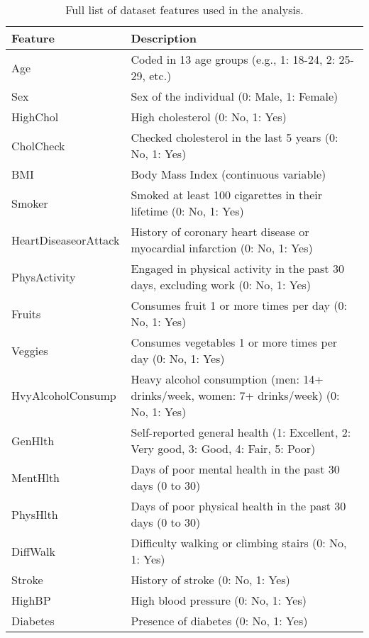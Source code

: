 \documentclass[a4paper,12pt]{article}
\begin{document}
\begin{table}[h!]
    \centering
    \begin{tabularx}{\textwidth}{|l|X|}
    \hline
    \textbf{Feature} & \textbf{Description} \\ \hline
    Age & Coded in 13 age groups (e.g., 1: 18-24, 2: 25-29, etc.) \\ \hline
    Sex & Sex of the individual (0: Male, 1: Female) \\ \hline
    HighChol & High cholesterol (0: No, 1: Yes) \\ \hline
    CholCheck & Checked cholesterol in the last 5 years (0: No, 1: Yes) \\ \hline
    BMI & Body Mass Index (continuous variable) \\ \hline
    Smoker & Smoked at least 100 cigarettes in their lifetime (0: No, 1: Yes) \\ \hline
    HeartDiseaseorAttack & History of coronary heart disease or myocardial infarction (0: No, 1: Yes) \\ \hline
    PhysActivity & Engaged in physical activity in the past 30 days, excluding work (0: No, 1: Yes) \\ \hline
    Fruits & Consumes fruit 1 or more times per day (0: No, 1: Yes) \\ \hline
    Veggies & Consumes vegetables 1 or more times per day (0: No, 1: Yes) \\ \hline
    HvyAlcoholConsump & Heavy alcohol consumption (men: 14+ drinks/week, women: 7+ drinks/week) (0: No, 1: Yes) \\ \hline
    GenHlth & Self-reported general health (1: Excellent, 2: Very good, 3: Good, 4: Fair, 5: Poor) \\ \hline
    MentHlth & Days of poor mental health in the past 30 days (0 to 30) \\ \hline
    PhysHlth & Days of poor physical health in the past 30 days (0 to 30) \\ \hline
    DiffWalk & Difficulty walking or climbing stairs (0: No, 1: Yes) \\ \hline
    Stroke & History of stroke (0: No, 1: Yes) \\ \hline
    HighBP & High blood pressure (0: No, 1: Yes) \\ \hline
    Diabetes & Presence of diabetes (0: No, 1: Yes) \\ \hline
    \end{tabularx}
    \caption{Full list of dataset features used in the analysis.}
    \label{tab:feature_list}
\end{table}

\printbibliography
\end{document}
